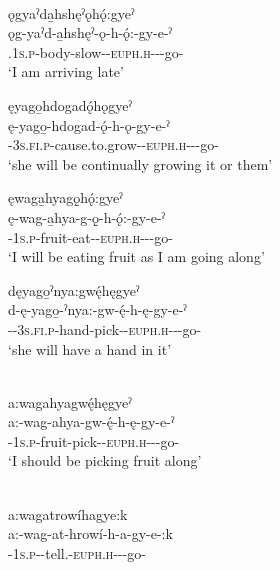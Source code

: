 \ea\label{ex:purpprogsufex10}  \\
ǫgyaˀda̱hshęˀǫhǫ́:gyeˀ\\\label{ex:purpprogsufex10a}
\gll ǫg-yaˀd-a̱hshęˀ-ǫ-h-ǫ́:-gy-e-ˀ\\
 \exsc{\factual}.\textsc{1s.p}-body-slow-{\stative}-\textsc{euph.h}-{\joiner}-{\progressive}-go-{\punctual}\\
\glt `I am arriving late'

\z


\ea\label{ex:purpprogsufex11} 
\ea\label{ex:purpprogsufex11a} ęyago̱hdogadǫ́hǫgyeˀ\\
\gll ę-yago̱-hdogad-ǫ́-h-ǫ-gy-e-ˀ\\
 \fut-\textsc{3s.fi.p}-cause.to.grow-{\stative}-\textsc{euph.h}-{\joiner}-{\progressive}-go-{\punctual}\\
\glt `she will be continually growing it or them'

\newpage
\ex ęwaga̱hyagǫ̱hǫ́:gyeˀ\\\label{ex:purpprogsufex11b}
\gll ę-wag-a̱hya-g-ǫ̱-h-ǫ́:-gy-e-ˀ\\
 \fut-\textsc{1s.p}-fruit-eat-{\stative}-\textsc{euph.h}-{\joiner}-{\progressive}-go-{\stative}\\
\glt `I will be eating fruit as I am going along'

\ex dęyago̱ˀnya:gwę́hęgyeˀ\\\label{ex:purpprogsufex11c}
\gll d-ę-yago̱-ˀnya:-gw-ę́-h-ę-gy-e-ˀ\\
 {\dualic}-{\future}-\textsc{3s.fi.p}-hand-pick-{\stative}-\textsc{euph.h}-{\joiner}-{\progressive}-go-{\punctual}\\
\glt `she will have a hand in it'
\z
\z

\ea\label{ex:purpprogsufex12} \\
a:wagahyagwę́hęgyeˀ\\
\gll a:-wag-ahya-gw-ę́-h-ę-gy-e-ˀ\\
 {\indefinite}-\textsc{1s.p}-fruit-pick-{\stative}-\textsc{euph.h}-{\joiner}-{\progressive}-go-{\punctual}\\
\glt `I should be picking fruit along'
\z


\ea\label{ex:purpprogsufex13} \\
a:wagatrowíhagye:k\\
\gll a:-wag-at-hrowí-h-a-gy-e-:k\\
{\indefinite}-\textsc{1s.p}-{\semireflexive}-tell.{\stative}-\textsc{euph.h}-{\joinerA}-{\progressive}-go-{\modalizer}\\
\z

